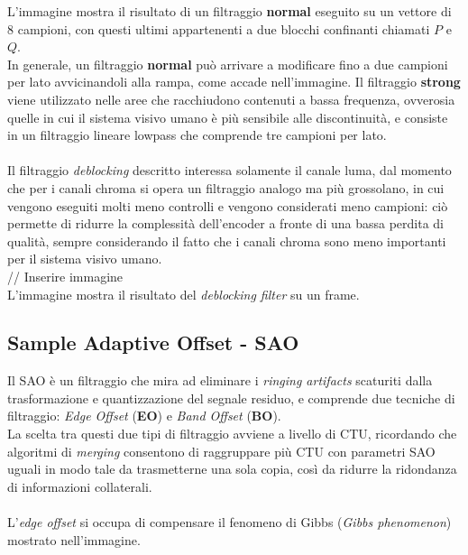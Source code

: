 L'immagine mostra il risultato di un filtraggio \textbf{normal} eseguito su un 
vettore di 8 campioni, con questi ultimi appartenenti a due blocchi confinanti 
chiamati $P$ e $Q$. \\
In generale, un filtraggio \textbf{normal} può arrivare a modificare fino a due
campioni per lato avvicinandoli alla rampa, come accade nell'immagine.
Il filtraggio \textbf{strong} viene utilizzato nelle aree che racchiudono 
contenuti a bassa frequenza, ovverosia quelle in cui il sistema visivo umano è 
più sensibile alle discontinuità, e consiste in un filtraggio lineare lowpass 
che comprende tre campioni per lato.
\\ \\
Il filtraggio \emph{deblocking} descritto interessa solamente il canale luma, 
dal momento che per i canali chroma si opera un filtraggio analogo ma più 
grossolano, in cui vengono eseguiti molti meno controlli e vengono considerati 
meno campioni: ciò permette di ridurre la complessità dell'encoder a fronte di 
una bassa perdita di qualità, sempre considerando il fatto che i canali chroma 
sono meno importanti per il sistema visivo umano.
\\
// Inserire immagine
\\
L'immagine mostra il risultato del \emph{deblocking filter} su un frame.


\subsection{Sample Adaptive Offset - SAO}
Il SAO è un filtraggio che mira ad eliminare i \emph{ringing artifacts} 
scaturiti dalla trasformazione e quantizzazione del segnale residuo, e 
comprende due tecniche di filtraggio: \emph{Edge Offset} (\textbf{EO}) e 
\emph{Band Offset} (\textbf{BO}).\\
La scelta tra questi due tipi di filtraggio avviene a livello di CTU, ricordando
che  algoritmi di \emph{merging} consentono di raggruppare più CTU con parametri
SAO uguali in modo tale da trasmetterne una sola copia, così da ridurre la 
ridondanza di informazioni collaterali.
\\ \\
L'\emph{edge offset} si occupa di compensare il fenomeno di Gibbs (\emph{Gibbs
phenomenon}) mostrato nell'immagine.

